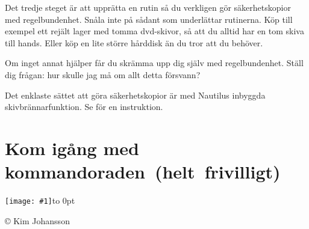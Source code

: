 \documentclass[a4paper,final]{memoir} %
\newcommand{\xrcredit}[1]{\hbox to 0pt{\hspace*{.6\baselineskip}\begin{rotate}{90}{\usefont{T1}{phv}{m}{n}\selectfont\tiny #1}\end{rotate}}}
\newcommand\xintropic[1]{{\texttt{[image: \#1]}\xrcredit{\copyright{} Kim Johansson}}\medskip}
\newcommand\xchapter[2]{\chapter{#2}\begin{center}\xintropic{#1}\end{center}}
\begin{document}
Det tredje steget är att upprätta en rutin så du verkligen gör säkerhetskopior med regelbundenhet. Snåla inte på sådant som underlättar rutinerna. Köp till exempel ett rejält lager med tomma dvd-skivor, så att du alltid har en tom skiva till hands. Eller köp en lite större hårddisk än du tror att du behöver. 

Om inget annat hjälper får du skrämma upp dig själv med regelbundenhet. Ställ dig frågan: hur skulle jag må om allt detta försvann?


Det enklaste sättet att göra säkerhetskopior är med Nautilus inbyggda skivbrännarfunktion. Se  för en instruktion.








\xchapter{bilder804-all/En_Introduktion_till_kommandoskalet}{Kom igång med \hbox{kommandoraden (helt frivilligt)}}\label{cha:kommandoraden}

\end{document}
